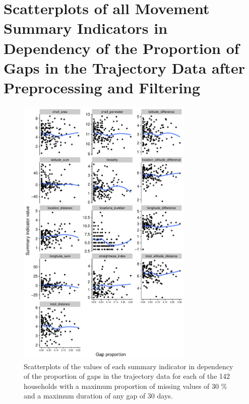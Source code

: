 \documentclass[]{elsarticle} %
\begin{document}
\hypertarget{scatterplots-of-all-movement-summary-indicators-in-dependency-of-the-proportion-of-gaps-in-the-trajectory-data-after-preprocessing-and-filtering}{%
\section{Scatterplots of all Movement Summary Indicators in Dependency
of the Proportion of Gaps in the Trajectory Data after Preprocessing and
Filtering}\label{scatterplots-of-all-movement-summary-indicators-in-dependency-of-the-proportion-of-gaps-in-the-trajectory-data-after-preprocessing-and-filtering}}

\begin{figure}[H]

{\centering \includegraphics[width=0.75\textwidth]{../figures/appendix-si-gaps-plot-1} 

}

\caption{Scatterplots of the values of each summary indicator in dependency of the proportion of gaps in the trajectory data for each of the 142 households with a maximum proportion of missing values of 30 \% and a maximum duration of any gap of 30 days.}\label{fig:appendix-si-gaps-plot}
\end{figure}
\end{document}
